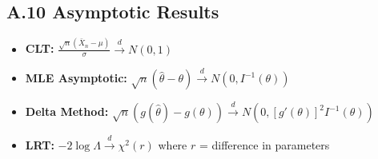 \documentclass[12pt,a4paper]{amsart}
\theoremstyle{remark}
\begin{document}
\subsection{A.10 Asymptotic Results}

\begin{itemize}
\item \textbf{CLT:} $\frac{\sqrt{n}(\bar{X}_n - \mu)}{\sigma} \stackrel{d}{\to} N(0,1)$
\item \textbf{MLE Asymptotic:} $\sqrt{n}(\hat{\theta} - \theta) \stackrel{d}{\to} N(0, I^{-1}(\theta))$
\item \textbf{Delta Method:} $\sqrt{n}(g(\hat{\theta}) - g(\theta)) \stackrel{d}{\to} N(0, [g'(\theta)]^2 I^{-1}(\theta))$
\item \textbf{LRT:} $-2\log\Lambda \stackrel{d}{\to} \chi^2(r)$ where $r$ = difference in parameters
\end{itemize}
\end{document}
